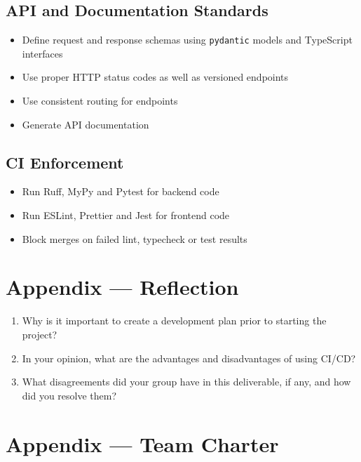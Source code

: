 \documentclass{article}
\begin{document}
\subsection*{API and Documentation Standards}
\begin{itemize}
    \item Define request and response schemas using \texttt{pydantic} models and TypeScript interfaces
    \item Use proper HTTP status codes as well as versioned endpoints
    \item Use consistent routing for endpoints
    \item Generate API documentation
\end{itemize}

\subsection*{CI Enforcement}
\begin{itemize}
    \item Run Ruff, MyPy and Pytest for backend code
    \item Run ESLint, Prettier and Jest for frontend code
    \item Block merges on failed lint, typecheck or test results
\end{itemize}

\newpage{}

\section*{Appendix --- Reflection}




\begin{enumerate}
    \item Why is it important to create a development plan prior to starting the
    project?
    \item In your opinion, what are the advantages and disadvantages of using
    CI/CD?
    \item What disagreements did your group have in this deliverable, if any,
    and how did you resolve them?
\end{enumerate}

\newpage{}

\section*{Appendix --- Team Charter}
\end{document}
